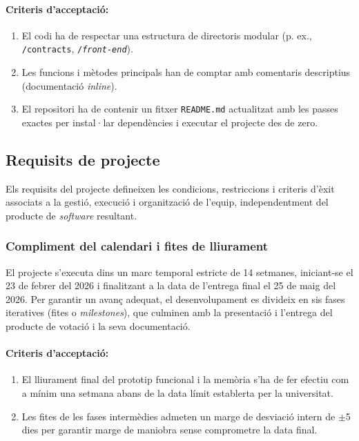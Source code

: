 \paragraph{Criteris d'acceptació:}
\begin{enumerate}[label=\roman*.]
    \item El codi ha de respectar una estructura de directoris modular (p. ex., \texttt{/contracts}, \texttt{/\textit{front-end}}).
    \item Les funcions i mètodes principals han de comptar amb comentaris descriptius (documentació \textit{inline}).
    \item El repositori ha de contenir un fitxer \texttt{README.md} actualitzat amb les passes exactes per instal·lar dependències i executar el projecte des de zero.
\end{enumerate}

\subsection{Requisits de projecte}

Els requisits del projecte defineixen les condicions, restriccions i criteris d'èxit associats a la gestió, execució i organització de l'equip, independentment del producte de \textit{software} resultant.

\subsubsection{Compliment del calendari i fites de lliurament}

El projecte s'executa dins un marc temporal estricte de 14 setmanes, iniciant-se el 23 de febrer del 2026 i finalitzant a la data de l'entrega final el 25 de maig del 2026. 
Per garantir un avanç adequat, el desenvolupament es divideix en sis fases iteratives (fites o \textit{milestones}), que culminen amb la presentació i l'entrega del producte de votació i la seva documentació.

\paragraph{Criteris d'acceptació:}
\begin{enumerate}[label=\roman*.]
    \item El lliurament final del prototip funcional i la memòria s'ha de fer efectiu com a mínim una setmana abans de la data límit establerta per la universitat.
    \item Les fites de les fases intermèdies admeten un marge de desviació intern de $\pm$5 dies per garantir marge de maniobra sense comprometre la data final.
\end{enumerate}


